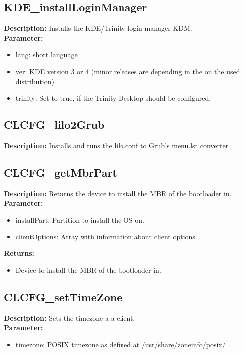 \subsection{KDE\_installLoginManager}
\textbf{Description:} Installs the KDE/Trinity login manager KDM.\\
\textbf{Parameter:}
\begin{itemize}
\item lang: short language
\item ver: KDE version 3 or 4 (minor releases are depending in the on the used distribution)
\item trinity: Set to true, if the Trinity Desktop should be configured.
\end{itemize}

\subsection{CLCFG\_lilo2Grub}
\textbf{Description:} Installs and runs the lilo.conf to Grub's menu.lst converter\\

\subsection{CLCFG\_getMbrPart}
\textbf{Description:} Returns the device to install the MBR of the bootloader in.\\
\textbf{Parameter:}
\begin{itemize}
\item installPart: Partition to install the OS on.
\item clientOptions: Array with information about client options.
\end{itemize}
\textbf{Returns:}
\begin{itemize}
\item Device to install the MBR of the bootloader in.
\end{itemize}

\subsection{CLCFG\_setTimeZone}
\textbf{Description:} Sets the timezone a a client.\\
\textbf{Parameter:}
\begin{itemize}
\item timezone: POSIX timezone as defined at /usr/share/zoneinfo/posix/
\end{itemize}

